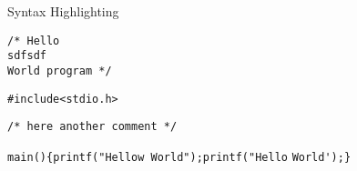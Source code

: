 \begin{frame}{Syntax Highlighting}~\color{Rhodamine}\begin{verbatim}/* Hello 
sdfsdf
World program */\end{verbatim}\leavevmode\newline\newline\color{Gray}\verb$#include<stdio.h>$\newline\color{Rhodamine}\begin{verbatim}/* here another comment */\end{verbatim}\leavevmode\newline\color{Aquamarine}\verb$main$\color{Fuchsia}\verb$($\color{Fuchsia}\verb$)$\newline\color{Fuchsia}\verb${$\newline\tab\tab\color{Aquamarine}\verb$printf$\color{Fuchsia}\verb$($\color{Emerald}\verb$"Hellow World"$\color{Fuchsia}\verb$)$\color{Fuchsia}\verb$;$\newline\tab\tab\color{Aquamarine}\verb$printf$\color{Fuchsia}\verb$($\color{Red}\verb$"$\color{Aquamarine}\verb$Hello$ \color{Aquamarine}\verb$World$\color{Red}\verb$'$\color{Fuchsia}\verb$)$\color{Fuchsia}\verb$;$\newline\newline\color{Fuchsia}\verb$}$\newline
\end{frame}
